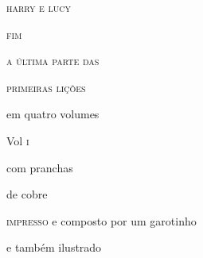 \begin{center}
\textsc{harry e lucy}

\textsc{fim}

\textsc{a última parte das}

\bigskip

\textsc{primeiras lições}

\bigskip

em quatro volumes

Vol \textsc{i}

com pranchas

de cobre

\medskip

\textsc{impresso} e composto por um garotinho

e também ilustrado

\end{center}

